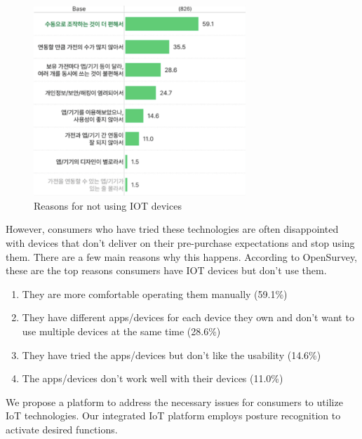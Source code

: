 \begin{figure}[ht]
    \includegraphics[width=8cm]{imgs/introduction/reason_why_not_use_iot.png}
    \caption{Reasons for not using IOT devices}
    \renewcommand{\thefigure}{\thesubsection.\arabic{figure}}
\end{figure}

However, consumers who have tried these technologies are often disappointed with devices that don't deliver on their pre-purchase expectations and stop using them. There are a few main reasons why this happens. According to OpenSurvey, these are the top reasons consumers have IOT devices but don't use them. \cite{iot-opensurvey}\\
\begin{enumerate}
    \item They are more comfortable operating them manually (59.1\%)\\
    \item They have different apps/devices for each device they own and don't want to use multiple devices at the same time (28.6\%)\\
    \item They have tried the apps/devices but don't like the usability (14.6\%)\\
    \item The apps/devices don't work well with their devices (11.0\%)\\
\end{enumerate}

We propose a platform to address the necessary issues for consumers to utilize IoT technologies. Our integrated IoT platform employs posture recognition to activate desired functions.\\\\

\newpage
